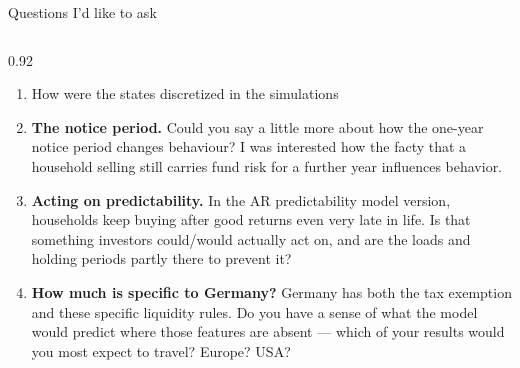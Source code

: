 \documentclass[aspectratio=169,10pt]{beamer}
\newcommand{\card}[1]{%
  \begin{columns}\begin{column}{0.92\textwidth}#1\end{column}\end{columns}}
\newcommand{\lead}[1]{\textbf{#1}}
\begin{document}
\begin{frame}{Questions I'd like to ask}
  \vfill
  \card{\footnotesize
  \begin{enumerate}\setlength{\itemsep}{0.7ex}\setcounter{enumi}{3}
    \item How were the states discretized in the simulations
    \item \lead{The notice period.} Could you say a little more about how the
      one-year notice period changes behaviour? I was interested how the facty that a
      household selling still carries fund risk for a further year influences behavior.
    \item \lead{Acting on predictability.} In the AR predictability model  version,
      households keep buying after good returns even very late in life. Is that
      something investors could/would actually act on, and are the loads and holding
      periods partly there to prevent it?
    \item \lead{How much is specific to Germany?} Germany has both the tax
      exemption and these specific liquidity rules. Do you have a sense of what
      the model would predict where those features are absent --- which of your
      results would you most expect to travel? Europe? USA?
  \end{enumerate}}
  \vspace{1.0ex}
  
  \vfill
\end{frame}
\end{document}
